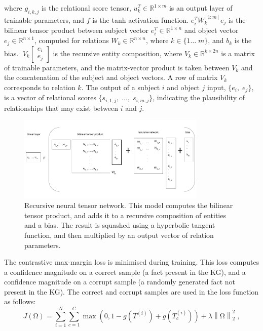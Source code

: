 \noindent where $ g_{i,k,j} $ is the relational score tensor, $ u_k^T \in \mathbb{R}^{1 \times m} $ is an output layer of trainable parameters, and $ f $ is the tanh activation function. $ e_i^TW_k^{\left [1:m \right ]} e_j $ is the bilinear tensor product between subject vector $ e_i^T \in \mathbb{R}^{1 \times n} $ and object vector $ e_j \in \mathbb{R}^{n \times 1} $, computed for relations $ W_k \in \mathbb{R}^{n \times n} $, where $ k \in \{1 \dots \; m \} $, and $ b_k $ is the bias. $ \; V_k \left [ \begin{matrix} e_i \\ e_j \end{matrix} \right ] $ is the recursive entity composition, where $ V_k \in \mathbb{R}^{k \times 2n} $ is a matrix of trainable parameters, and the matrix-vector product is taken between $ V_k $ and the concatenation of the subject and object vectors. A row of matrix $ V_k $ corresponds to relation $ k $. The output of a subject $ i $ and object $ j $ input, $ \{ e_i, \; e_j \} $, is a vector of relational scores $ \{ s_{i,1,j}, \; \dots, \; s_{i,m,j} \} $, indicating the plausibility of relationships that may exist between $ i $ and $ j $. 

\begin{figure}[H]
   	\centering
    	\includegraphics[width=0.8\textwidth, height=0.4\textwidth]{recursive_neural_tensor_network.png}
	\caption{Recursive neural tensor network. This model computes the bilinear tensor product, and adds it to a recursive composition of entities and a bias. The result is squashed using a hyperbolic tangent function, and then multiplied by an output vector of relation parameters.}
\end{figure}

\noindent The contrastive max-margin loss is minimised during training. This loss computes a confidence magnitude on a correct sample (a fact present in the KG), and a confidence magnitude on a corrupt sample (a randomly generated fact not present in the KG). The correct and corrupt samples are used in the loss function as follows:
\begin{equation}
	J(\si{\ohm}) =  \sum_{i=1}^N \sum_{c=1}^C \max(0,1 - g(T^{(i)}) + g(T_c^{(i)})) + \lambda \left \lVert \si{\ohm} \right \rVert_2^2 \; ,
\end{equation}

